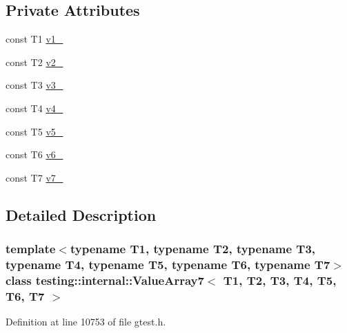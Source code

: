 \subsection*{\-Private \-Attributes}
\begin{DoxyCompactItemize}
\item 
const \-T1 \hyperlink{classtesting_1_1internal_1_1ValueArray7_aac1d0654cc6c1aceb4a5d0fa7a98042e}{v1\-\_\-}
\item 
const \-T2 \hyperlink{classtesting_1_1internal_1_1ValueArray7_a9f0a8ce6ce2fd27e980c4c51a7a7256a}{v2\-\_\-}
\item 
const \-T3 \hyperlink{classtesting_1_1internal_1_1ValueArray7_a4f8257321a2eab0456239174d6712d5e}{v3\-\_\-}
\item 
const \-T4 \hyperlink{classtesting_1_1internal_1_1ValueArray7_aac184059fee257381ccae81d8d112f85}{v4\-\_\-}
\item 
const \-T5 \hyperlink{classtesting_1_1internal_1_1ValueArray7_a1f3e0ada8419ed2e17cc61e6c0c54404}{v5\-\_\-}
\item 
const \-T6 \hyperlink{classtesting_1_1internal_1_1ValueArray7_a13d84d5824617bbc6fb1a6b3ee3cb745}{v6\-\_\-}
\item 
const \-T7 \hyperlink{classtesting_1_1internal_1_1ValueArray7_a4063f0b7a528133d018ee488ba44a9a3}{v7\-\_\-}
\end{DoxyCompactItemize}


\subsection{\-Detailed \-Description}
\subsubsection*{template$<$typename \-T1, typename \-T2, typename \-T3, typename \-T4, typename \-T5, typename \-T6, typename \-T7$>$class testing\-::internal\-::\-Value\-Array7$<$ T1, T2, T3, T4, T5, T6, T7 $>$}



\-Definition at line 10753 of file gtest.\-h.



